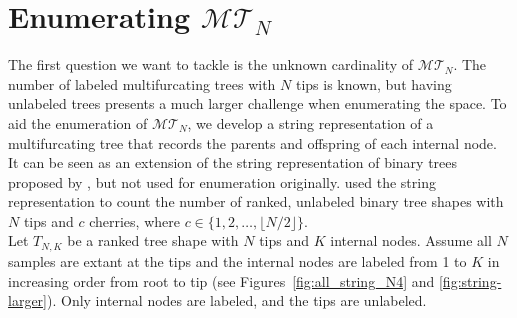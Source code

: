 \documentclass{article}
\newtheorem{definition}{Definition}
\begin{document}
\section{Enumerating $\mathcal{MT}_N$} \label{sec:string}

The first question we want to tackle is the unknown cardinality of $\mathcal{MT}_N$. The number of labeled multifurcating trees with $N$ tips is known, but having unlabeled trees presents a much larger challenge when enumerating the space. To aid the enumeration of $\mathcal{MT}_N$, we develop a string representation of a multifurcating tree that records the parents and offspring of each internal node. It can be seen as an extension of the string representation of binary trees proposed by \cite{donaghey1975alternating}, but not used for enumeration originally. \cite{callan2009note} used the string representation to count the number of ranked, unlabeled binary tree shapes with $N$ tips and $c$ cherries, where $c \in \{1,2,\ldots,\lfloor N/2 \rfloor\}$. \\ 

Let $T_{N,K}$ be a ranked tree shape with $N$ tips and $K$ internal nodes. Assume all $N$ samples are extant at the tips and the internal nodes are labeled from 1 to $K$ in increasing order from root to tip (see Figures~\ref{fig:all_string_N4} and \ref{fig:string-larger}). Only internal nodes are labeled, and the tips are unlabeled. 

\end{document}
